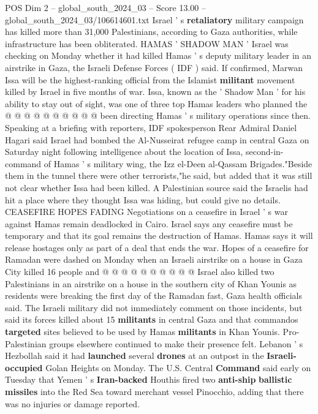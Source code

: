 \begin{textsample}{POS Dim 2 – global\_south\_2024\_03 – Score 13.00 – global\_south\_2024\_03/106614601.txt}
Israel ' s \textbf{retaliatory} military campaign has killed more than 31,000 Palestinians, according to Gaza authorities, while infrastructure has been obliterated.
HAMAS ' SHADOW MAN ' Israel was checking on Monday whether it had killed Hamas ' s deputy military leader in an airstrike in Gaza, the Israeli Defense Forces ( IDF ) said.
If confirmed, Marwan Issa will be the highest-ranking official from the Islamist \textbf{militant} movement killed by Israel in five months of war.
Issa, known as the ' Shadow Man ' for his ability to stay out of sight, was one of three top Hamas leaders who planned the @ @ @ @ @ @ @ @ @ @ been directing Hamas ' s military operations since then.
Speaking at a briefing with reporters, IDF spokesperson Rear Admiral Daniel Hagari said Israel had bombed the Al-Nusseirat refugee camp in central Gaza on Saturday night following intelligence about the location of Issa, second-in-command of Hamas ' s military wing, the Izz el-Deen al-Qassam Brigades."Beside them in the tunnel there were other terrorists,"he said, but added that it was still not clear whether Issa had been killed.
A Palestinian source said the Israelis had hit a place where they thought Issa was hiding, but could give no details.
CEASEFIRE HOPES FADING Negotiations on a ceasefire in Israel ' s war against Hamas remain deadlocked in Cairo.
Israel says any ceasefire must be temporary and that its goal remains the destruction of Hamas.
Hamas says it will release hostages only as part of a deal that ends the war.
Hopes of a ceasefire for Ramadan were dashed on Monday when an Israeli airstrike on a house in Gaza City killed 16 people and @ @ @ @ @ @ @ @ @ @ Israel also killed two Palestinians in an airstrike on a house in the southern city of Khan Younis as residents were breaking the first day of the Ramadan fast, Gaza health officials said.
The Israeli military did not immediately comment on those incidents, but said its forces killed about 15 \textbf{militants} in central Gaza and that commandos \textbf{targeted} sites believed to be used by Hamas \textbf{militants} in Khan Younis.
Pro-Palestinian groups elsewhere continued to make their presence felt.
Lebanon ' s Hezbollah said it had \textbf{launched} several \textbf{drones} at an outpost in the \textbf{Israeli-occupied} Golan Heights on Monday.
The U.S.
Central \textbf{Command} said early on Tuesday that Yemen ' s \textbf{Iran-backed} Houthis fired two \textbf{anti-ship} \textbf{ballistic} \textbf{missiles} into the Red Sea toward merchant vessel Pinocchio, adding that there was no injuries or damage reported.

\end{textsample}
